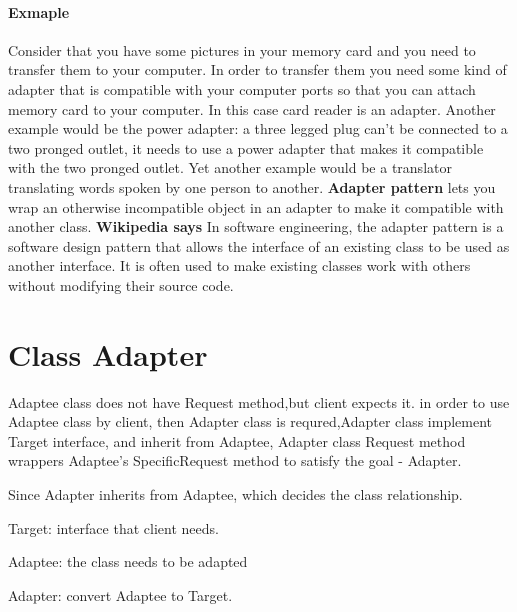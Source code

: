 \documentclass{book}
\begin{document}
\paragraph{Exmaple}
Consider that you have some pictures in your memory card and you need to transfer them to your computer.
In order to transfer them you need some kind of adapter that is compatible with your computer ports so that you can attach memory card to your computer.
In this case card reader is an adapter.
Another example would be the power adapter: a three legged plug can't be connected to a two pronged outlet, it needs to use a power adapter that makes it compatible with the two pronged outlet.
Yet another example would be a translator translating words spoken by one person to another.
\textbf{Adapter pattern} lets you wrap an otherwise incompatible object in an adapter to make it compatible with another class.
\textbf{Wikipedia says}
In software engineering, the adapter pattern is a software design pattern that allows the interface of an existing class to be used as another interface.
It is often used to make existing classes work with others without modifying their source code.
\section{Class Adapter}\label{AdapterPatternClass}

\begin{figure}[H]
\begin{floatrow}
\end{floatrow}
\end{figure}

Adaptee class does not have Request method,but client expects it.
in order to use Adaptee class by client, then Adapter class is requred,Adapter class implement Target interface, and inherit from Adaptee,
Adapter class Request method wrappers Adaptee's SpecificRequest method to satisfy the goal - Adapter.

Since Adapter inherits from Adaptee, which decides the class relationship.

Target: interface that client needs.

Adaptee: the class needs to be adapted

Adapter: convert Adaptee to Target.
\end{document}

